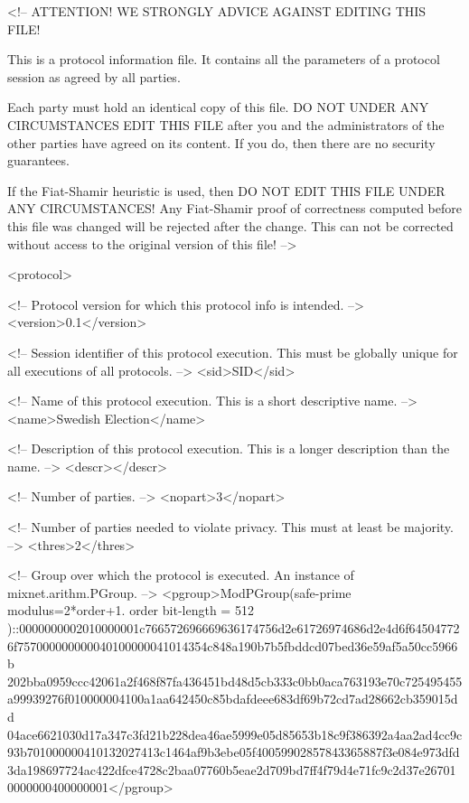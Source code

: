 
<!-- ATTENTION! WE STRONGLY ADVICE AGAINST EDITING THIS FILE!
     
     This is a protocol information file. It contains all the 
     parameters of a protocol session as agreed by all parties.
     
     Each party must hold an identical copy of this file. DO NOT 
     UNDER ANY CIRCUMSTANCES EDIT THIS FILE after you and the 
     administrators of the other parties have agreed on its content.
     If you do, then there are no security guarantees.
     
     If the Fiat-Shamir heuristic is used, then DO NOT EDIT THIS 
     FILE UNDER ANY CIRCUMSTANCES! Any Fiat-Shamir proof of 
     correctness computed before this file was changed will be 
     rejected after the change. This can not be corrected without 
     access to the original version of this file! -->

<protocol>

   <!-- Protocol version for which this protocol info is intended. -->
   <version>0.1</version>

   <!-- Session identifier of this protocol execution. This must be 
        globally unique for all executions of all protocols. -->
   <sid>SID</sid>

   <!-- Name of this protocol execution. This is a short descriptive 
        name. -->
   <name>Swedish Election</name>

   <!-- Description of this protocol execution. This is a longer 
        description than the name. -->
   <descr></descr>

   <!-- Number of parties. -->
   <nopart>3</nopart>

   <!-- Number of parties needed to violate privacy. This must at 
        least be majority. -->
   <thres>2</thres>

   <!-- Group over which the protocol is executed. An instance of 
        mixnet.arithm.PGroup. -->
   <pgroup>ModPGroup(safe-prime modulus=2*order+1. order bit-length = 512
)::0000000002010000001c766572696669636174756d2e61726974686d2e4d6f64504772
6f757000000000040100000041014354c848a190b7b5fbddcd07bed36e59af5a50cc5966b
202bba0959ccc42061a2f468f87fa436451bd48d5cb333c0bb0aca763193e70c725495455
a99939276f010000004100a1aa642450c85bdafdeee683df69b72cd7ad28662cb359015dd
04ace6621030d17a347c3fd21b228dea46ae5999e05d85653b18c9f386392a4aa2ad4cc9c
93b701000000410132027413c1464af9b3ebe05f40059902857843365887f3e084e973dfd
3da198697724ac422dfce4728c2baa07760b5eae2d709bd7ff4f79d4e71fc9c2d37e26701
0000000400000001</pgroup>

